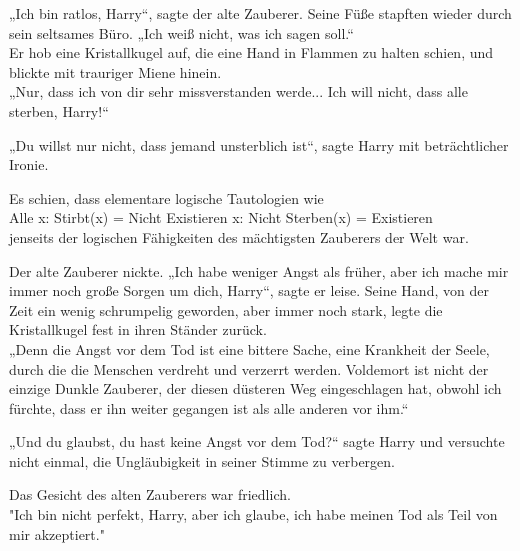 {„Ich bin ratlos, Harry“, sagte der alte Zauberer. Seine Füße stapften wieder durch sein seltsames Büro. „Ich weiß nicht, was ich sagen soll.“\\ Er hob eine Kristallkugel auf, die eine Hand in Flammen zu halten schien, und blickte mit trauriger Miene hinein.\\ „Nur, dass ich von dir sehr missverstanden werde... Ich will nicht, dass alle sterben, Harry!“

„Du willst nur nicht, dass jemand unsterblich ist“, sagte Harry mit beträchtlicher Ironie.

Es schien, dass elementare logische Tautologien wie\\ Alle x: Stirbt(x) = Nicht Existieren x: Nicht Sterben(x) = Existieren\\ jenseits der logischen Fähigkeiten des mächtigsten Zauberers der Welt war.

Der alte Zauberer nickte. „Ich habe weniger Angst als früher, aber ich mache mir immer noch große Sorgen um dich, Harry“, sagte er leise. Seine Hand, von der Zeit ein wenig schrumpelig geworden, aber immer noch stark, legte die Kristallkugel fest in ihren Ständer zurück.\\ „Denn die Angst vor dem Tod ist eine bittere Sache, eine Krankheit der Seele, durch die die Menschen verdreht und verzerrt werden. Voldemort ist nicht der einzige Dunkle Zauberer, der diesen düsteren Weg eingeschlagen hat, obwohl ich fürchte, dass er ihn weiter gegangen ist als alle anderen vor ihm.“

„Und du glaubst, du hast keine Angst vor dem Tod?“ sagte Harry und versuchte nicht einmal, die Ungläubigkeit in seiner Stimme zu verbergen.

Das Gesicht des alten Zauberers war friedlich.\\ "Ich bin nicht perfekt, Harry, aber ich glaube, ich habe meinen Tod als Teil von mir akzeptiert."

}
